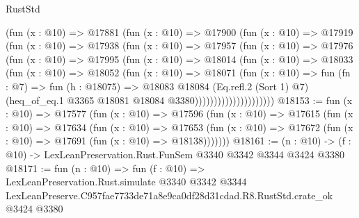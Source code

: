 \begin{lexlean}{RustStd}
\begin{coremodule}
                    (fun (x : @10) =>
                    @17881
                      (fun (x : @10) =>
                      @17900
                        (fun (x : @10) =>
                        @17919
                          (fun (x : @10) =>
                          @17938
                            (fun (x : @10) =>
                            @17957
                              (fun (x : @10) =>
                              @17976
                                (fun (x : @10) =>
                                @17995
                                  (fun (x : @10) =>
                                  @18014
                                    (fun (x : @10) =>
                                    @18033
                                      (fun (x : @10) =>
                                      @18052
                                        (fun (x : @10) =>
                                        @18071
                                          (fun (x : @10) =>
                                          fun (fn : @7) =>
                                          fun (h : @18075) =>
                                          @18083
                                            @18084
                                            (Eq.refl.{2} (Sort 1) @7)
                                            (heq_of_eq.{1}
                                              @3365
                                              @18081
                                              @18084
                                              @3380)))))))))))))))))))))
@18153 := fun (x : @10) =>
  @17577
    (fun (x : @10) =>
    @17596
      (fun (x : @10) =>
      @17615
        (fun (x : @10) =>
        @17634
          (fun (x : @10) =>
          @17653 (fun (x : @10) => @17672 (fun (x : @10) => @17691 (fun (x : @10) => @18138)))))))
@18161 := (n : @10) -> (f : @10) -> LexLeanPreservation.Rust.FunSem @3340 @3342 @3344 @3424 @3380
@18171 := fun (n : @10) =>
  fun (f : @10) =>
  LexLeanPreservation.Rust.simulate
    @3340
    @3342
    @3344
    LexLeanPreserve.C957fae7733de71a8e9ca0df28d31cdad.R8.RustStd.crate_ok
    @3424
    @3380
\end{coremodule}
\end{lexlean}
